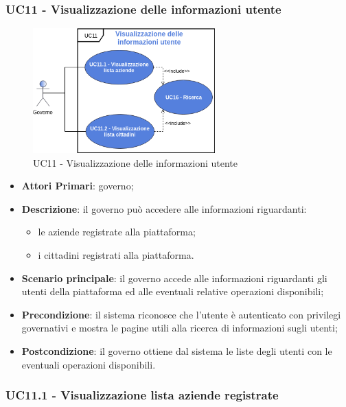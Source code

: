  \subsubsection{UC11 - Visualizzazione delle informazioni utente}
 \begin{figure}[h]
 	\includegraphics[width=7cm]{res/images/UC11-Generale.png}
 	\centering
 	\caption{UC11 - Visualizzazione delle informazioni utente}
 	
 \end{figure}
 \begin{itemize}
 	\item \textbf{Attori Primari}: governo;
 	\item \textbf{Descrizione}: il governo può accedere alle informazioni riguardanti:
 	\begin{itemize}
 		\item le aziende registrate alla piattaforma;
 		\item i cittadini registrati alla piattaforma.

 	\end{itemize}
 	\item \textbf{Scenario principale}: il governo accede alle informazioni riguardanti gli utenti della piattaforma ed alle eventuali relative operazioni disponibili;

 	\item \textbf{Precondizione}: il sistema riconosce che l'utente è autenticato con privilegi governativi e mostra le pagine utili alla ricerca di informazioni sugli utenti;
 	
 	\item \textbf{Postcondizione}: il governo ottiene dal sistema le liste degli utenti con le eventuali operazioni disponibili.
 \end{itemize}

\subsubsection{UC11.1 - Visualizzazione lista aziende registrate}

